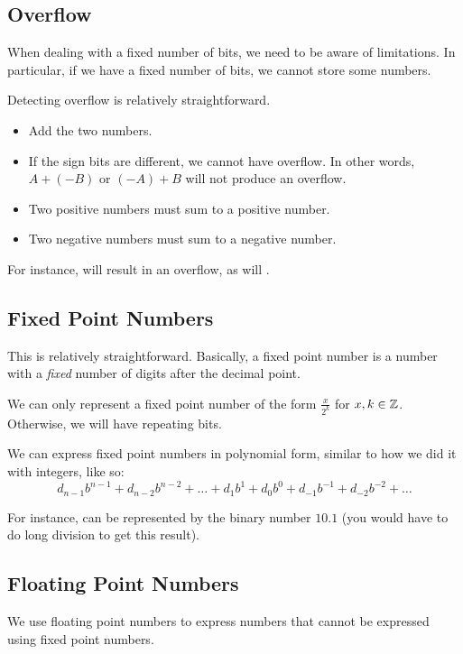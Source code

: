 \documentclass[letterpaper]{article}
\begin{document}
\subsection{Overflow}
When dealing with a fixed number of bits, we need to be aware of limitations. In particular, if we have a fixed number of bits, we cannot store some numbers.

\bigskip 

Detecting overflow is relatively straightforward. 
\begin{itemize}
    \item Add the two numbers. 
    \item If the sign bits are different, we cannot have overflow. In other words, $A + (-B)$ or $(-A) + B$ will not produce an overflow. 
    \item Two positive numbers must sum to a positive number. 
    \item Two negative numbers must sum to a negative number. 
\end{itemize}

For instance,  will result in an overflow, as will . 

\subsection{Fixed Point Numbers}
This is relatively straightforward. Basically, a fixed point number is a number with a \emph{fixed} number of digits after the decimal point. 

\bigskip 

We can only represent a fixed point number of the form $\frac{x}{2^k}$ for $x, k \in \mathbb{Z}$. Otherwise, we will have repeating bits. 

\bigskip 

We can express fixed point numbers in polynomial form, similar to how we did it with integers, like so:
\[d_{n - 1} b^{n - 1} + d_{n - 2} b^{n - 2} + \dots + d_1 b^1 + d_0 b^0 + d_{-1} b^{-1} + d_{-2} b^{-2} + \dots\]

For instance,  can be represented by the binary number $10.1$ (you would have to do long division to get this result). 

\subsection{Floating Point Numbers}
We use floating point numbers to express numbers that cannot be expressed using fixed point numbers. 
\end{document}
